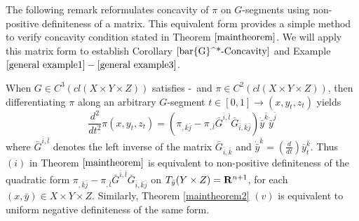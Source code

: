 The following remark reformulates concavity of $\pi$ on $G$-segments using non-positive definiteness of a matrix. This equivalent form provides a simple method to verify concavity condition stated in Theorem $\ref{maintheorem}$. We will apply this matrix form to establish Corollary $\ref{bar{G}^*-Concavity}$ and Example $\ref{general example1} - \ref{general example3}$.\medskip

\begin{lemma}\label{LemmaProfitConcavity}
	When $G \in C^3(cl(X\times Y \times Z))$ satisfies \Gzero-\Gsix \ and  $\pi \in C^2(cl(X\times Y \times Z))$, then differentiating $\pi$ along an arbitrary $G$-segment $t \in[0,1] \longrightarrow (x,y_t,z_t)$ yields
	\begin{equation}\label{pi second}
	\frac{d^2}{dt^2} \pi(x, y_t, z_t) = (\pi_{,\bar{k}\bar{j}}- \pi_{,\bar{l}} \bar{G}^{\bar i,\bar l}\bar{G}_{\bar{i},\bar{k}\bar{j}}) \dot {\bar y}^{\bar k} \dot {\bar y}^{\bar j}
	\end{equation}
	where $\bar{G}^{\bar i,\bar l}$ denotes the left inverse of the matrix $\bar{G}_{\bar{i}, \bar{k} }$
	and $\dot {\bar y}^{\bar k} = (\frac{d}{dt})\bar y^{\bar k}_t$.
	Thus $(i)$ in Theorem $\ref{maintheorem}$  is equivalent to non-positive  definiteness of the quadratic form 
	$\pi_{,\bar{k}\bar{j}}- \pi_{,\bar{l}} \bar{G}^{\bar i,\bar l}\bar{G}_{\bar{i},\bar{k}\bar{j}}$
	on $T_{\bar y}  (Y\times Z) = {\mathbf R}^{n+1}$, { for each  $(x, \bar y) \in X \times Y \times Z$.} Similarly, Theorem \ref{maintheorem2} $(v)$ is equivalent to uniform negative definiteness of the same form.
\end{lemma}	

